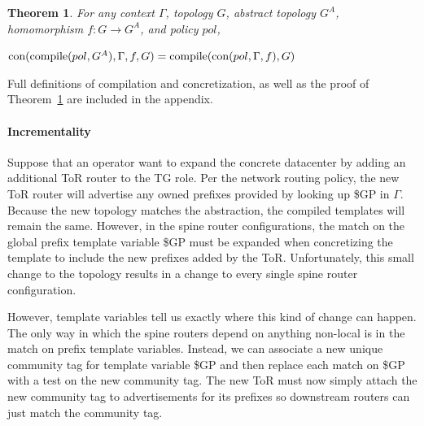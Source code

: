 \documentclass[numbers, 10pt, preprint]{sigplanconf}
\newcommand{\para}[1]{\paragraph*{\textbf{#1}}}
\newtheorem{thm}{Theorem}
\begin{document}


\begin{thm}
  For any context $\Gamma$, topology $G$, abstract topology $G^A$, homomorphism $f : G \rightarrow G^A$, and policy $pol$,

  \noindent
  $\text{con}(\text{compile}(pol,G^A), \Gamma,f,G) = \text{compile}(\text{con}(pol,\Gamma,f),G)$
  \label{thm:concretization}
\end{thm}
%
\vspace{-1em}
Full definitions of compilation and concretization, as well as the proof of Theorem~\ref{thm:concretization} are included in the appendix.


\para{Incrementality}

Suppose that an operator want to expand the concrete datacenter by adding an additional ToR router to the TG role. Per the network routing policy, the new ToR router will advertise any owned prefixes provided by looking up {\small \$GP} in $\Gamma$. Because the new topology matches the abstraction, the compiled templates will remain the same. However, in the spine router configurations, the match on the global prefix template variable {\small \$GP} must be expanded when concretizing the template to include the new prefixes added by the ToR. Unfortunately, this small change to the topology results in a change to every single spine router configuration.

However, template variables tell us exactly where this kind of change can happen. The only way in which the spine routers depend on anything non-local is in the match on prefix template variables. Instead, we can associate a new unique community tag for template variable {\small \$GP} and then replace each match on {\small \$GP} with a test on the new community tag. The new ToR must now simply attach the new community tag to advertisements for its prefixes so downstream routers can just match the community tag.
\end{document}

